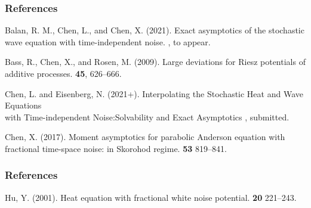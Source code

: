 \documentclass{beamer}%
\numberwithin{equation}{section}
\begin{document}
	\begin{frame}
		\frametitle{References}
		\small
		
		\begin{thebibliography}{999}
			Balan, R. M., Chen, L., and Chen, X. (2021).
			\newblock Exact asymptotics of the stochastic wave equation with time-independent noise.
			, to appear.
			
			Bass, R., Chen, X., and Rosen, M. (2009).
			\newblock Large deviations for Riesz potentials of additive processes.
			 \textbf{45}, 626--666.
			
			Chen, L. and Eisenberg, N. (2021+).
			\newblock Interpolating the Stochastic Heat and Wave Equations\\ with Time-independent Noise:Solvability and Exact Asymptotics
			, submitted.
			
			Chen, X. (2017).
			\newblock Moment asymptotics for parabolic Anderson equation with fractional time-space noise: in Skorohod regime.
			 {\bf 53} 819--841.
			
		\end{thebibliography}
	\end{frame}
	
	\begin{frame}[t]
		\frametitle{References}
		\small
		
		\begin{thebibliography}{999}
			Hu, Y. (2001).
			\newblock Heat equation with fractional white noise potential.
			 {\bf 20} 221--243.
		\end{thebibliography}
	\end{frame}
	
\end{document}
